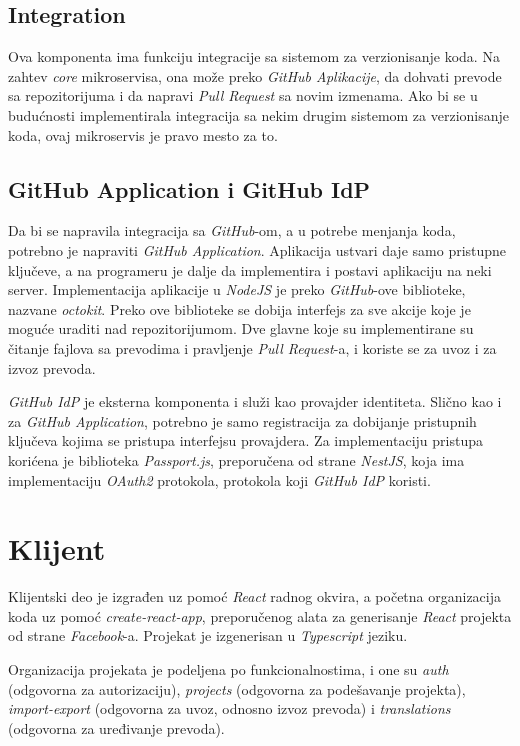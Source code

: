 \subsection{Integration}
Ova komponenta ima funkciju integracije sa sistemom za verzionisanje koda. 
Na zahtev \textit{core} mikroservisa, ona može preko \textit{GitHub Aplikacije}, 
da dohvati prevode sa repozitorijuma i da napravi \textit{Pull Request} sa 
novim izmenama. Ako bi se u budućnosti implementirala integracija sa nekim 
drugim sistemom za verzionisanje koda, ovaj mikroservis je pravo mesto za to.

\subsection{GitHub Application i GitHub IdP}
Da bi se napravila integracija sa \textit{GitHub}-om, a u potrebe menjanja 
koda, potrebno je napraviti \textit{GitHub Application}. Aplikacija 
ustvari daje samo pristupne ključeve, a na programeru je dalje da implementira 
i postavi aplikaciju na neki server. Implementacija aplikacije u \textit{NodeJS} 
je preko \textit{GitHub}-ove biblioteke, nazvane \textit{octokit}. Preko ove 
biblioteke se dobija interfejs za sve akcije koje je moguće uraditi nad 
repozitorijumom. Dve glavne koje su implementirane su čitanje fajlova sa 
prevodima i pravljenje \textit{Pull Request}-a, i koriste se za uvoz i za 
izvoz prevoda.

\textit{GitHub IdP} je eksterna komponenta i služi kao provajder identiteta. 
Slično kao i za \textit{GitHub Application}, potrebno je samo registracija 
za dobijanje pristupnih ključeva kojima se pristupa interfejsu provajdera. 
Za implementaciju pristupa korićena je biblioteka \textit{Passport.js}, 
preporučena od strane \textit{NestJS}, koja ima implementaciju 
\textit{OAuth2} protokola, protokola koji \textit{GitHub IdP} koristi.

\section{Klijent}
Klijentski deo je izgrađen uz pomoć \textit{React} radnog okvira, a početna 
organizacija koda uz pomoć \textit{create-react-app}, preporučenog alata za 
generisanje \textit{React} projekta od strane \textit{Facebook}-a. 
Projekat je izgenerisan u \textit{Typescript} jeziku. 

Organizacija projekata je podeljena po funkcionalnostima, i one su 
\textit{auth} (odgovorna za autorizaciju), \textit{projects} (odgovorna za 
podešavanje projekta), \textit{import-export} (odgovorna za 
uvoz, odnosno izvoz prevoda) i \textit{translations} (odgovorna za uređivanje 
prevoda).

